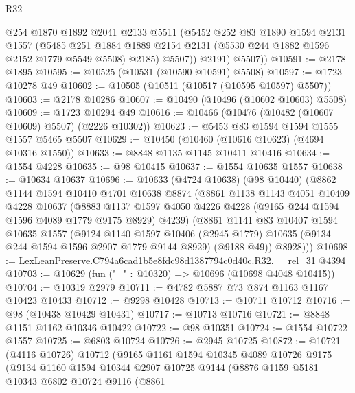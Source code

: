 \begin{lexlean}{R32}
\begin{coremodule}
            @254
            @1870
            @1892
            @2041
            @2133
            @5511
            (@5452
              @252
              @83
              @1890
              @1594
              @2131
              @1557
              (@5485
                @251
                @1884
                @1889
                @2154
                @2131
                (@5530 @244 @1882 @1596 @2152 @1779 @5549 @5508)
                @2185)
              @5507))
          @2191)
        @5507))
@10591 := @2178 @1895
@10595 := @10525 (@10531 (@10590 @10591) @5508)
@10597 := @1723 @10278 @49
@10602 := @10505 (@10511 (@10517 (@10595 @10597) @5507))
@10603 := @2178 @10286
@10607 := @10490 (@10496 (@10602 @10603) @5508)
@10609 := @1723 @10294 @49
@10616 := @10466 (@10476 (@10482 (@10607 @10609) @5507) (@2226 @10302))
@10623 := @5453 @83 @1594 @1594 @1555 @1557 @5465 @5507
@10629 := @10450 (@10460 (@10616 @10623) (@4694 @10316 @1550))
@10633 := @8848 @1135 @1145 @10411 @10416
@10634 := @1554 @4228
@10635 := @98 @10415
@10637 := @1554 @10635 @1557
@10638 := @10634 @10637
@10696 := @10633
    (@4724 @10638)
    (@98 @10440)
    (@8862
      @1144
      @1594
      @10410
      @4701
      @10638
      @8874
      (@8861
        @1138
        @1143
        @4051
        @10409
        @4228
        @10637
        (@8883 @1137 @1597 @4050 @4226 @4228 (@9165 @244 @1594 @1596 @4089 @1779 @9175 @8929) @4239)
        (@8861
          @1141
          @83
          @10407
          @1594
          @10635
          @1557
          (@9124
            @1140
            @1597
            @10406
            (@2945 @1779)
            @10635
            (@9134 @244 @1594 @1596 @2907 @1779 @9144 @8929)
            (@9188 @49))
          @8928)))
@10698 := LexLeanPreserve.C794a6cad1b5e8fdc98d1387794c0d40c.R32.__rel_31 @4394
@10703 := @10629 (fun ("_" : @10320) => @10696 (@10698 @4048 @10415))
@10704 := @10319 @2979
@10711 := @4782 @5887 @73 @874 @1163 @1167 @10423 @10433
@10712 := @9298 @10428
@10713 := @10711 @10712
@10716 := @98 (@10438 @10429 @10431)
@10717 := @10713 @10716
@10721 := @8848 @1151 @1162 @10346 @10422
@10722 := @98 @10351
@10724 := @1554 @10722 @1557
@10725 := @6803 @10724
@10726 := @2945 @10725
@10872 := @10721
    (@4116 @10726)
    @10712
    (@9165
      @1161
      @1594
      @10345
      @4089
      @10726
      @9175
      (@9134
        @1160
        @1594
        @10344
        @2907
        @10725
        @9144
        (@8876
          @1159
          @5181
          @10343
          @6802
          @10724
          @9116
          (@8861

\end{coremodule}
\end{lexlean}
